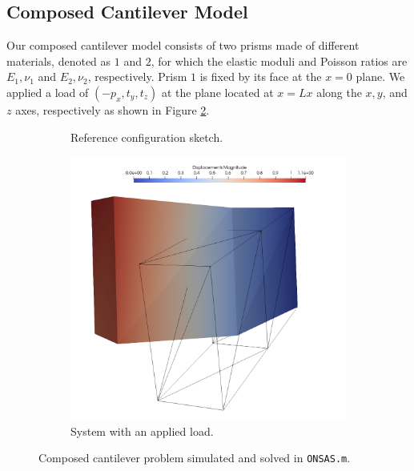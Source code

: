 \documentclass[11pt]{scrartcl} %
\begin{document}
\subsection{Composed Cantilever Model}
Our composed cantilever model consists of two prisms made of different materials, denoted as $1$ and $2$, for which the elastic moduli and Poisson ratios are $E_1, \nu_1$ and $E_2, \nu_2$, respectively. Prism $1$ is fixed by its face at the $x=0$ plane. We applied a load of $(-p_x, t_y, t_z)$ at the plane located at $x=Lx$ along the $x, y$, and $z$ axes, respectively as shown in Figure \ref{fig:composed_cantilever_model}.

\begin{figure}[h]
	\centering
	\begin{subfigure}[b]{0.48\textwidth}
	\def\svgwidth{\textwidth}
	
	\caption{Reference configuration sketch.}
	\label{fig:ex1_ilus}
	\end{subfigure}
	\hfill
	\begin{subfigure}[b]{0.48\textwidth}
	\centering
	\includegraphics[width=\textwidth]{Figures/Ejemplo2.png}
	\caption{System with an applied load.}
	\end{subfigure}
	\caption{Composed cantilever problem simulated and solved in \texttt{ONSAS.m}.}
	\label{fig:composed_cantilever_model}
\end{figure}
\end{document}
